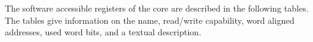 The software accessible registers of the core are described in the following
tables. The tables give information on the name, read/write capability, word 
aligned addresses, used word bits, and a textual description.



